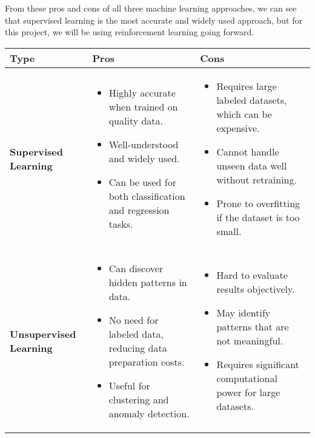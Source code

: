 From these pros and cons of all three machine learning approaches, we can see that supervised learning is the most accurate and widely used approach,
but for this project, we will be using reinforcement learning going forward.

\begin{table}[H]      
      \begin{tabular}{| m{3.5cm} | m{5cm} | m{5cm} |}
            \hline
            \textbf{Type} & \textbf{Pros} & \textbf{Cons} \\ 
            \hline
            \textbf{Supervised Learning} & 
            \begin{itemize}
                  \item Highly accurate when trained on quality data.
                  \item Well-understood and widely used.
                  \item Can be used for both classification and regression tasks.
            \end{itemize} & 
            \begin{itemize}
                  \item Requires large labeled datasets, which can be expensive.
                  \item Cannot handle unseen data well without retraining.
                  \item Prone to overfitting if the dataset is too small.
            \end{itemize} \\ 
            \hline
            \textbf{Unsupervised Learning} & 
            \begin{itemize}
                  \item Can discover hidden patterns in data.
                  \item No need for labeled data, reducing data preparation costs.
                  \item Useful for clustering and anomaly detection.
            \end{itemize} & 
            \begin{itemize}
                  \item Hard to evaluate results objectively.
                  \item May identify patterns that are not meaningful.
                  \item Requires significant computational power for large datasets.
            \end{itemize} \\ 

\end{tabular}
\end{table}
